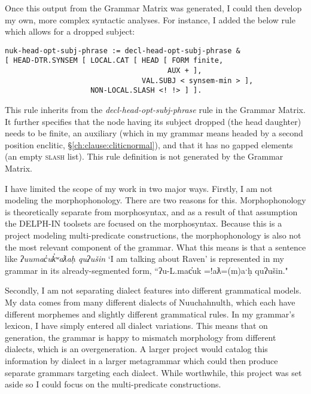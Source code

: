 Once this output from the Grammar Matrix was generated, I could then develop my own, more complex syntactic analyses. For instance, I added the below rule which allows for a dropped subject:

\begin{verbatim}
nuk-head-opt-subj-phrase := decl-head-opt-subj-phrase &
[ HEAD-DTR.SYNSEM [ LOCAL.CAT [ HEAD [ FORM finite,
                                      AUX + ],
                                VAL.SUBJ < synsem-min > ],
                    NON-LOCAL.SLASH <! !> ] ].
\end{verbatim}

\noindent This rule inherits from the \textit{decl-head-opt-subj-phrase} rule in the Grammar Matrix. It further specifies that the node having its subject dropped (the head daughter) needs to be finite, an auxiliary (which in my grammar means headed by a second position enclitic, \S\ref{ch:clause:cliticnormal}), and that it has no gapped elements (an empty \textsc{slash} list). This rule definition is not generated by the Grammar Matrix.

I have limited the scope of my work in two major ways. Firstly, I am not modeling the morphophonology. There are two reasons for this. Morphophonology is theoretically separate from morphosyntax, and as a result of that assumption the DELPH-IN toolsets are focused on the morphosyntax. Because this is a project modeling multi-predicate constructions, the morphophonology is also not the most relevant component of the grammar. What this means is that a sentence like \textit{ʔuumac̓uk̓ʷaƛaḥ quʔušin} `I am talking about Raven' is represented in my grammar in its already-segmented form, ``ʔu-L.mac̓uk =!aƛ=(m)aˑḥ quʔušin."

Secondly, I am not separating dialect features into different grammatical models. My data comes from many different dialects of Nuuchahnulth, which each have different morphemes and slightly different grammatical rules. In my grammar's lexicon, I have simply entered all dialect variations. This means that on generation, the grammar is happy to mismatch morphology from different dialects, which is an overgeneration. A larger project would catalog this information by dialect in a larger metagrammar which could then produce separate grammars targeting each dialect. While worthwhile, this project was set aside so I could focus on the multi-predicate constructions.

